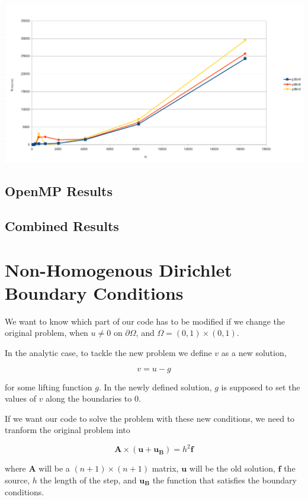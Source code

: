 \documentclass[fontsize=11pt,paper=a4,titlepage]{article}
\begin{document}
\includegraphics[scale=0.5]{pics/p36nX.png}

\subsection{OpenMP Results}

\subsection{Combined Results}

\section{Non-Homogenous Dirichlet Boundary Conditions}

We want to know which part of our code has to be modified if we change the
original problem, when $u \neq 0$ on $\partial\Omega$, and $\Omega = (0,1)
\times (0,1)$.

In the analytic case, to tackle the new problem we define $v$ as a new solution,

\begin{equation}
	v = u - g
\end{equation}

for some lifting function $g$. In the newly defined solution, $g$ is supposed to
set the values of $v$ along the boundaries to $0$.

If we want our code to solve the problem with these new conditions, we need to
tranform the original problem into

\begin{displaymath}
	\mathbf{A} \times (\mathbf{u} + \mathbf{u_B}) = h^2 \mathbf{f}
\end{displaymath}

where $\mathbf{A}$ will be a $(n + 1) \times (n + 1)$ matrix, $\mathbf{u}$ will
be the old solution, $\mathbf{f}$ the source, $h$ the length of the step, and
$\mathbf{u_B}$ the function that satisfies the boundary conditions.
\end{document}
